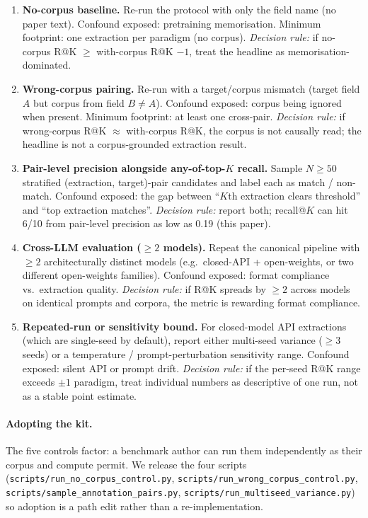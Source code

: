 \documentclass[11pt]{article}
\newcommand{\fpath}[1]{\mbox{}\nolinkurl{#1}}
\begin{document}
\begin{enumerate}[leftmargin=*]
\item \textbf{No-corpus baseline.} Re-run the protocol with only the field name (no paper text). Confound exposed: pretraining memorisation. Minimum footprint: one extraction per paradigm (no corpus). \emph{Decision rule:} if no-corpus R@K $\geq$ with-corpus R@K $-1$, treat the headline as memorisation-dominated.

\item \textbf{Wrong-corpus pairing.} Re-run with a target/corpus mismatch (target field $A$ but corpus from field $B \neq A$). Confound exposed: corpus being ignored when present. Minimum footprint: at least one cross-pair. \emph{Decision rule:} if wrong-corpus R@K $\approx$ with-corpus R@K, the corpus is not causally read; the headline is not a corpus-grounded extraction result.

\item \textbf{Pair-level precision alongside any-of-top-$K$ recall.} Sample $N \geq 50$ stratified (extraction, target)-pair candidates and label each as match / non-match. Confound exposed: the gap between ``$K$th extraction clears threshold'' and ``top extraction matches''. \emph{Decision rule:} report both; recall@$K$ can hit 6/10 from pair-level precision as low as 0.19 (this paper).

\item \textbf{Cross-LLM evaluation (${\geq}2$ models).} Repeat the canonical pipeline with $\geq 2$ architecturally distinct models (e.g.\ closed-API + open-weights, or two different open-weights families). Confound exposed: format compliance vs.\ extraction quality. \emph{Decision rule:} if R@K spreads by ${\geq}2$ across models on identical prompts and corpora, the metric is rewarding format compliance.

\item \textbf{Repeated-run or sensitivity bound.} For closed-model API extractions (which are single-seed by default), report either multi-seed variance (${\geq}3$ seeds) or a temperature / prompt-perturbation sensitivity range. Confound exposed: silent API or prompt drift. \emph{Decision rule:} if the per-seed R@K range exceeds ${\pm}1$ paradigm, treat individual numbers as descriptive of one run, not as a stable point estimate.
\end{enumerate}

\paragraph{Adopting the kit.} The five controls factor: a benchmark author can run them independently as their corpus and compute permit. We release the four scripts (\fpath{scripts/run_no_corpus_control.py}, \fpath{scripts/run_wrong_corpus_control.py}, \fpath{scripts/sample_annotation_pairs.py}, \fpath{scripts/run_multiseed_variance.py}) so adoption is a path edit rather than a re-implementation.
\end{document}
